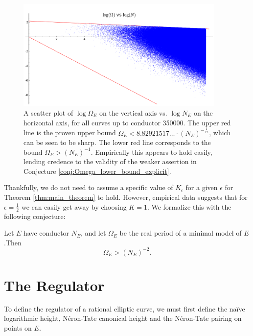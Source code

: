 \begin{figure}[!ht]
    \centering
    \includegraphics[width=0.92\textwidth]{graphics/real_periods_vs_conductors_loglog}
    \caption{A scatter plot of $\log \Omega_E $ on the vertical axis vs. $\log N_E$ on the horizontal axis, for all curves up to conductor 350000. The upper red line is the proven upper bound $\Omega_E < 8.82921517\ldots \cdot (N_E)^{-\frac{1}{12}}$, which can be seen to be sharp. The lower red line corresponds to the bound $\Omega_E > (N_E)^{-1}$. Empirically this appears to hold easily, lending credence to the validity of the weaker assertion in Conjecture \ref{conj:Omega_lower_bound_explicit}.}
    \label{fig:real_period_vs_conductor_loglog}
\end{figure}

Thankfully, we do not need to assume a specific value of $K_{\epsilon}$ for a given $\epsilon$ for Theorem \ref{thm:main_theorem} to hold. However, empirical data suggests that for $\epsilon=\frac{1}{2}$ we can easily get away by choosing $K = 1$. We formalize this with the following conjecture:
\begin{conjecture}\label{conj:Omega_lower_bound_explicit}
Let $E$ have conductor $N_E$, and let $\Omega_E$ be the real period of a minimal model of $E$.Then 
\begin{equation}
\Omega_E > (N_E)^{-2}.
\end{equation}
\end{conjecture}

\newpage
\section{The Regulator}

To define the regulator of a rational elliptic curve, we must first define the na\"ive logarithmic height, N\'eron-Tate canonical height and the N\'eron-Tate pairing on points on $E$. \\


